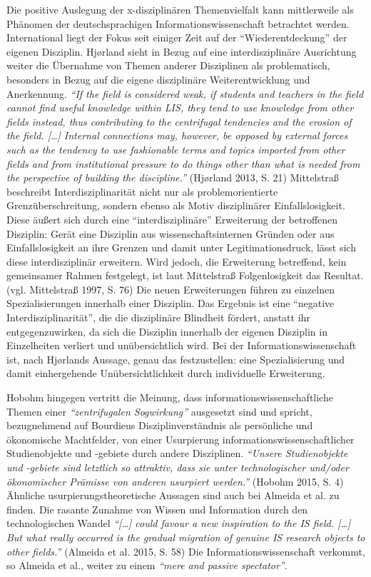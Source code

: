 \documentclass[a4paper,
fontsize=11pt,
oneside,
numbers=noperiodatend,
parskip=half-,
bibliography=totoc,
final
]{scrartcl}
\begin{document}
Die positive Auslegung der x-disziplinären Themenvielfalt kann
mittlerweile als Phänomen der deutschsprachigen Informationswissenschaft
betrachtet werden. International liegt der Fokus seit einiger Zeit auf
der \enquote{Wiederentdeckung} der eigenen Disziplin. Hjørland sieht in
Bezug auf eine interdisziplinäre Ausrichtung weiter die Übernahme von
Themen anderer Disziplinen als problematisch, besonders in Bezug auf die
eigene disziplinäre Weiterentwicklung und Anerkennung. \emph{\enquote{If
the field is considered weak, if students and teachers in the field
cannot find useful knowledge within LIS, they tend to use knowledge from
other fields instead, thus contributing to the centrifugal tendencies
and the erosion of the field. {[}\ldots{}{]} Internal connections may,
however, be opposed by external forces such as the tendency to use
fashionable terms and topics imported from other fields and from
institutional pressure to do things other than what is needed from the
perspective of building the discipline.}} (Hjørland 2013, S. 21)
Mittelstraß beschreibt Interdisziplinarität nicht nur als
problemorientierte Grenzüberschreitung, sondern ebenso als Motiv
disziplinärer Einfallslosigkeit. Diese äußert sich durch eine
\enquote{interdisziplinäre} Erweiterung der betroffenen Disziplin: Gerät
eine Disziplin aus wissenschaftsinternen Gründen oder aus
Einfallslosigkeit an ihre Grenzen und damit unter Legitimationsdruck,
lässt sich diese interdisziplinär erweitern. Wird jedoch, die
Erweiterung betreffend, kein gemeinsamer Rahmen festgelegt, ist laut
Mittelstraß Folgenlosigkeit das Resultat. (vgl. Mittelstraß 1997, S. 76)
Die neuen Erweiterungen führen zu einzelnen Spezialisierungen innerhalb
einer Disziplin. Das Ergebnis ist eine \enquote{negative
Interdisziplinarität}, die die disziplinäre Blindheit fördert, anstatt
ihr entgegenzuwirken, da sich die Disziplin innerhalb der eigenen
Disziplin in Einzelheiten verliert und unübersichtlich wird. Bei der
Informationswissenschaft ist, nach Hjørlands Aussage, genau das
festzustellen: eine Spezialisierung und damit einhergehende
Unübersichtlichkeit durch individuelle Erweiterung.

Hobohm hingegen vertritt die Meinung, dass informationswissenschaftliche
Themen einer \emph{\enquote{zentrifugalen Sogwirkung}} ausgesetzt sind
und spricht, bezugnehmend auf Bourdieus Disziplinverständnis als
persönliche und ökonomische Machtfelder, von einer Usurpierung
informationswissenschaftlicher Studienobjekte und -gebiete durch andere
Disziplinen. \emph{\enquote{Unsere Studienobjekte und -gebiete sind
letztlich so attraktiv, dass sie unter technologischer und/oder
ökonomischer Prämisse von anderen usurpiert werden.}} (Hobohm 2015, S.
4) Ähnliche usurpierungstheoretische Aussagen sind auch bei Almeida et
al. zu finden. Die rasante Zunahme von Wissen und Information durch den
technologischen Wandel \emph{\enquote{{[}\ldots{}{]} could favour a new
inspiration to the IS field. {[}\ldots{}{]} But what really occurred is
the gradual migration of genuine IS research objects to other fields.}}
(Almeida et al. 2015, S. 58) Die Informationswissenschaft verkommt, so
Almeida et al., weiter zu einem \emph{\enquote{mere and passive
spectator}}.
\end{document}
